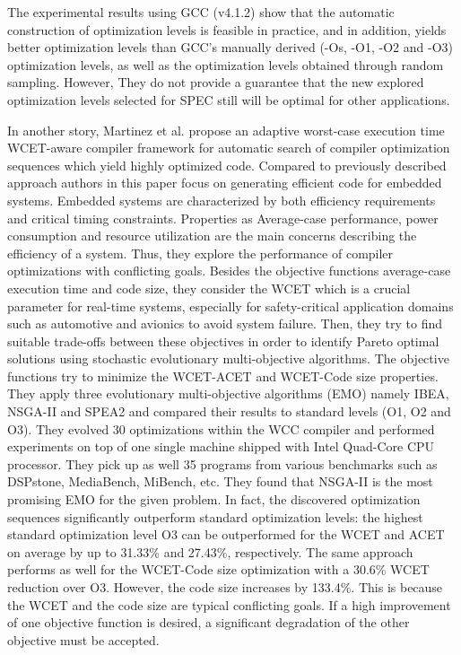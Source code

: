 The experimental results using GCC (v4.1.2) show that the automatic construction
of optimization levels is feasible in practice, and in addition, yields better optimization levels than GCC’s manually derived (-Os, -O1, -O2 and -O3) optimization levels, as well as the optimization levels obtained through random sampling.
However, They do not provide a guarantee that the new explored optimization levels selected for SPEC still will be optimal for other applications.


In another story, Martinez et al.\cite{martinez2014multi} propose an adaptive worst-case execution time WCET-aware compiler framework for automatic search of compiler optimization sequences which yield highly optimized code. 
Compared to previously described approach authors in this paper focus on generating efficient code for embedded systems. Embedded systems are characterized by both efficiency requirements and critical timing constraints. Properties as Average-case performance, power consumption and resource utilization are the main concerns describing the efficiency of a system. 
Thus, they explore the performance of compiler optimizations with conflicting goals. 
Besides the objective functions average-case execution time and code size, they consider the WCET which is a crucial parameter for real-time systems, especially for
safety-critical application domains such as automotive and
avionics to avoid system failure. 
Then, they try to find suitable trade-offs between these objectives in order to identify Pareto optimal solutions using stochastic evolutionary multi-objective algorithms. The objective functions try to minimize the WCET-ACET and WCET-Code size properties. They apply three evolutionary multi-objective algorithms (EMO) namely IBEA, NSGA-II and SPEA2 and compared their results to standard levels (O1, O2 and O3). 
They evolved 30 optimizations within the WCC compiler and performed experiments on top of one single machine shipped with Intel Quad-Core CPU processor. They pick up as well 35  programs from various benchmarks such as DSPstone, MediaBench, MiBench, etc.
They found that NSGA-II is the most promising EMO for the given problem. In fact, the discovered optimization sequences significantly outperform standard optimization levels:
the highest standard optimization level O3 can be outperformed for the WCET and ACET on average by up to 31.33\% and 27.43\%, respectively. The same approach performs as well for the WCET-Code size optimization with a 30.6\% WCET reduction over O3. However, the code size increases by 133.4\%. This is because the WCET and the code size are typical conflicting goals. If a high improvement of one objective function is desired, a significant degradation of the other objective must be accepted.

